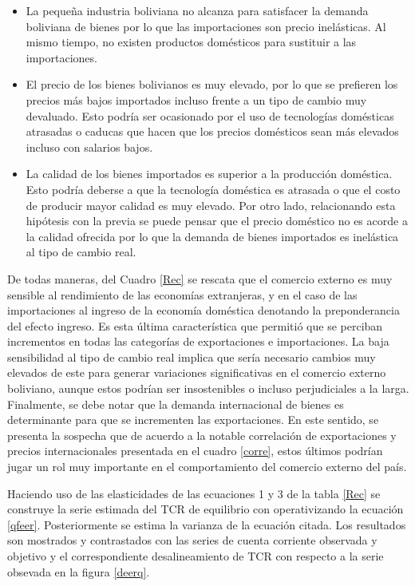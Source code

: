 \documentclass[12pt,letterpaper]{article}
\begin{document}
\begin{itemize}
\item La pequeña industria boliviana no alcanza para satisfacer la demanda boliviana de bienes por lo que las importaciones son precio inelásticas. Al mismo tiempo, no existen productos domésticos para sustituir a las importaciones.
\item El precio de los bienes bolivianos es muy elevado, por lo que se prefieren los precios más bajos importados incluso frente a un tipo de cambio muy devaluado. Esto podría ser ocasionado por el uso de tecnologías domésticas atrasadas o caducas que hacen que los precios domésticos sean más elevados incluso con salarios bajos.
\item La calidad de los bienes importados es superior a la producción doméstica. Esto podría deberse a que la tecnología doméstica es atrasada o que el costo de producir mayor calidad es muy elevado. Por otro lado, relacionando esta hipótesis con la previa se puede pensar que el precio doméstico no es acorde a la calidad ofrecida por lo que la demanda de bienes importados es inelástica al tipo de cambio real. 
\end{itemize}

De todas maneras, del Cuadro \ref{Rec} se rescata que el comercio externo es muy sensible al rendimiento de las economías extranjeras, y en el caso de las importaciones al ingreso de la economía doméstica denotando la preponderancia del efecto ingreso. Es esta última característica que permitió que se perciban incrementos en todas las categorías de exportaciones e importaciones. La baja sensibilidad al tipo de cambio real implica que sería necesario cambios muy elevados de este para generar variaciones significativas en el comercio externo boliviano, aunque estos podrían ser insostenibles o incluso perjudiciales a la larga. Finalmente, se debe notar que la demanda internacional de bienes es determinante para que se incrementen las exportaciones. En este sentido, se presenta la sospecha que de acuerdo a la notable correlación de exportaciones y precios internacionales presentada en el cuadro \ref{corre}, estos últimos podrían jugar un rol muy importante en el comportamiento del comercio externo del país.

Haciendo uso de las elasticidades de las ecuaciones 1 y 3 de la tabla \ref{Rec} se construye la serie estimada del TCR de equilibrio con operativizando la ecuación \ref{qfeer}. Posteriormente se estima la varianza de la ecuación citada. Los resultados son mostrados y contrastados con las series de cuenta corriente observada y objetivo y el correspondiente desalineamiento de TCR con respecto a la serie obsevada en la figura \ref{deerq}.
\end{document}
